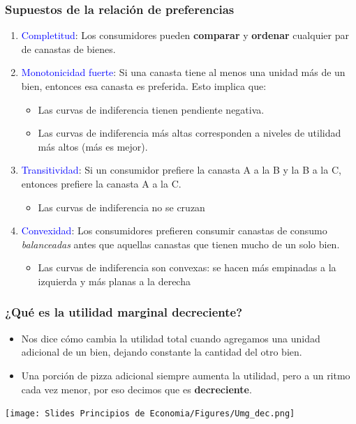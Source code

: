 \documentclass{beamer}
\begin{document}
\begin{frame}
\frametitle{Supuestos de la relación de preferencias}
    \begin{enumerate}
    \item \textcolor{blue}{Completitud}: Los consumidores pueden \textbf{comparar} y \textbf{ordenar} cualquier par de canastas de bienes.
    \item \textcolor{blue}{Monotonicidad fuerte}: Si una canasta tiene al menos una unidad más de un bien, entonces esa canasta es preferida. Esto implica que:
    \begin{itemize}
        \item Las curvas de indiferencia tienen pendiente negativa. 
        \item Las curvas de indiferencia más altas corresponden a niveles de utilidad más altos (más es mejor).
    \end{itemize}
    \item \textcolor{blue}{Transitividad}: Si un consumidor prefiere la canasta A a la B y la B a la C, entonces prefiere la canasta A a la C.
    \begin{itemize}
        \item Las curvas de indiferencia no se cruzan
    \end{itemize}


\item \textcolor{blue}{Convexidad}: Los consumidores prefieren consumir canastas de consumo \textit{balanceadas} antes que aquellas canastas que tienen mucho de un solo bien.
    \begin{itemize}
        \item Las curvas de indiferencia son convexas: se hacen más empinadas a la izquierda y más planas a la derecha 
    \end{itemize}
\end{enumerate} 
\end{frame}



\begin{frame}
\frametitle{¿Qué es la utilidad marginal decreciente?}
\begin{itemize}
    \item Nos dice cómo cambia la utilidad total cuando agregamos una unidad adicional de un bien, dejando constante la cantidad del otro bien.
    \item  Una porción de pizza adicional siempre aumenta la utilidad, pero a un ritmo cada vez menor, por eso decimos que es \textbf{decreciente}.
    \end{itemize}    
    \vspace{2mm}
\begin{center}
    \texttt{[image: Slides Principios de Economia/Figures/Umg\_dec.png]}
    \end{center}
\end{frame}
\end{document}
